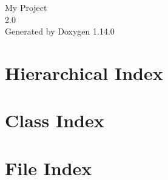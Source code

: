 \documentclass[twoside]{book}
\newcommand{\+}{\discretionary{\mbox{\scriptsize$\hookleftarrow$}}{}{}}
\newcommand{\clearemptydoublepage}{%
    \newpage{\pagestyle{empty}\cleardoublepage}%
  }
\begin{document}
  \raggedbottom
    \hypersetup{pageanchor=false,
                bookmarksnumbered=true,
                pdfencoding=unicode
               }
  \begin{titlepage}
  \vspace*{7cm}
  \begin{center}%
  {\Large My Project}\\
  [1ex]\large 2.\+0 \\
  \vspace*{1cm}
  {\large Generated by Doxygen 1.14.0}\\
  \end{center}
  \end{titlepage}
  \clearemptydoublepage
  \tableofcontents
  \clearemptydoublepage
  \hypersetup{pageanchor=true}
\chapter{Hierarchical Index}

\chapter{Class Index}

\chapter{File Index}

\end{document}
